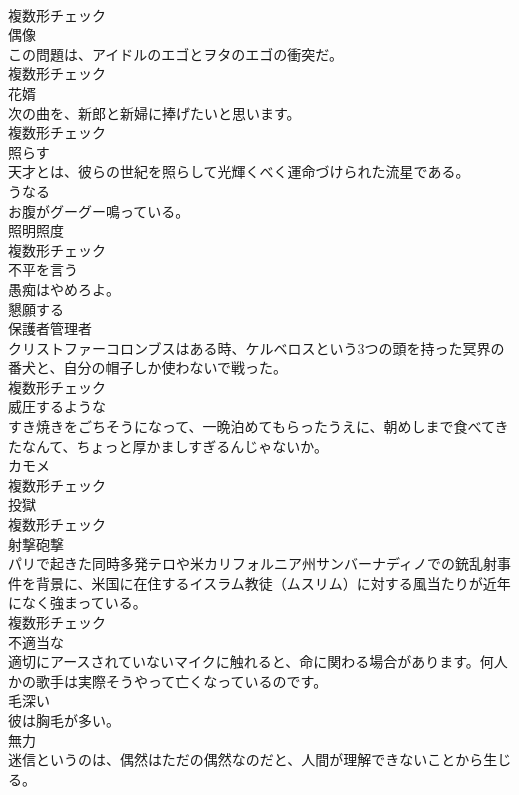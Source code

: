 \documentclass[8pt]{extreport}
\begin{document}
\begin{CJK}{UTF8}{min}
\\	複数形チェック
\\	[名詞]	偶像	
\\	この問題は、アイドルのエゴとヲタのエゴの衝突だ。	
\\	複数形チェック
\\	[名詞]	花婿	
\\	次の曲を、新郎と新婦に捧げたいと思います。	
\\	複数形チェック
\\	[動詞]	照らす	
\\	天才とは、彼らの世紀を照らして光輝くべく運命づけられた流星である。	
\\	[動詞]	うなる	
\\	お腹がグーグー鳴っている。	
\\	[名詞]	照明照度	
\\	複数形チェック
\\	[動詞]	不平を言う	
\\	愚痴はやめろよ。	
\\	[動詞]	懇願する	
\\	[名詞]	保護者管理者	
\\	クリストファーコロンブスはある時、ケルベロスという3つの頭を持った冥界の番犬と、自分の帽子しか使わないで戦った。	
\\	複数形チェック
\\	[形容詞]	威圧するような	
\\	すき焼きをごちそうになって、一晩泊めてもらったうえに、朝めしまで食べてきたなんて、ちょっと厚かましすぎるんじゃないか。	
\\	[名詞]	カモメ	
\\	複数形チェック
\\	[名詞]	投獄	
\\	複数形チェック
\\	[名詞]	射撃砲撃	
\\	パリで起きた同時多発テロや米カリフォルニア州サンバーナディノでの銃乱射事件を背景に、米国に在住するイスラム教徒（ムスリム）に対する風当たりが近年になく強まっている。	
\\	複数形チェック
\\	[形容詞]	不適当な	
\\	適切にアースされていないマイクに触れると、命に関わる場合があります。何人かの歌手は実際そうやって亡くなっているのです。	
\\	[形容詞]	毛深い	
\\	彼は胸毛が多い。	
\\	[名詞]	無力	
\\	迷信というのは、偶然はただの偶然なのだと、人間が理解できないことから生じる。	

\end{CJK}
\end{document}
